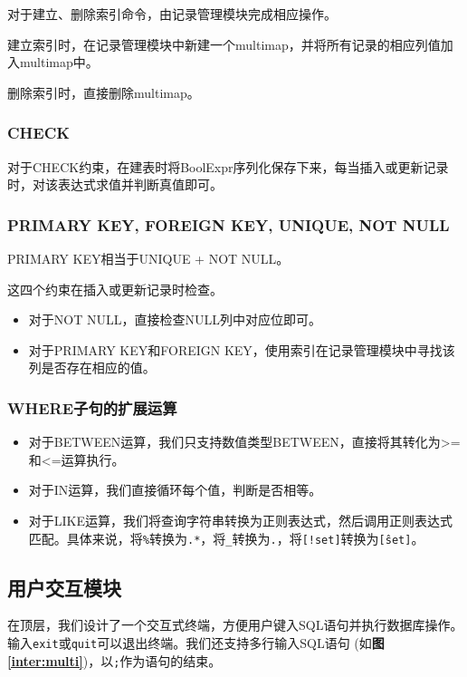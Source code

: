 \documentclass[11pt, a4paper]{article}
\newcommand{\fref}[1]{\textbf{图\ref{#1}}}
\begin{document}
对于建立、删除索引命令，由记录管理模块完成相应操作。

建立索引时，在记录管理模块中新建一个multimap，并将所有记录的相应列值加入multimap中。

删除索引时，直接删除multimap。

\subsubsection{CHECK}

对于CHECK约束，在建表时将BoolExpr序列化保存下来，每当插入或更新记录时，对该表达式求值并判断真值即可。

\subsubsection{PRIMARY KEY, FOREIGN KEY, UNIQUE, NOT NULL}

PRIMARY KEY相当于UNIQUE + NOT NULL。

这四个约束在插入或更新记录时检查。

\begin{itemize}
\item 对于NOT NULL，直接检查NULL列中对应位即可。
\item 对于PRIMARY KEY和FOREIGN KEY，使用索引在记录管理模块中寻找该列是否存在相应的值。
\end{itemize}

\subsubsection{WHERE子句的扩展运算}

\begin{itemize}
\item 对于BETWEEN运算，我们只支持数值类型BETWEEN，直接将其转化为>=和<=运算执行。
\item 对于IN运算，我们直接循环每个值，判断是否相等。
\item 对于LIKE运算，我们将查询字符串转换为正则表达式，然后调用正则表达式匹配。具体来说，将\texttt{\%}转换为\texttt{.*}，将\texttt{_}转换为\texttt{.}，将\texttt{[!set]}转换为\texttt{[\^set]}。
\end{itemize}

\subsection{用户交互模块}

在顶层，我们设计了一个交互式终端，方便用户键入SQL语句并执行数据库操作。输入\texttt{exit}或\texttt{quit}可以退出终端。我们还支持多行输入SQL语句  (如\fref{inter:multi})，以\texttt{;}作为语句的结束。
\end{document}
